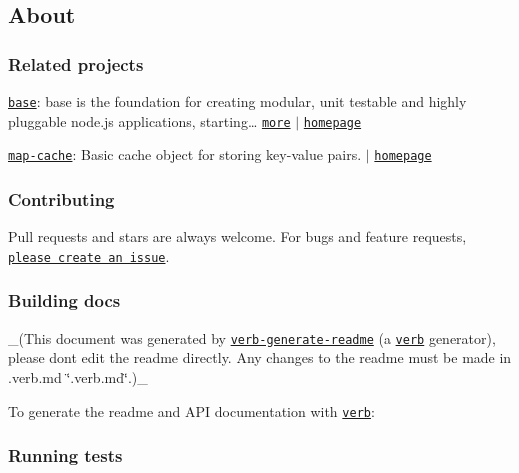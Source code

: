 \subsection*{About}

\subsubsection*{Related projects}


\begin{DoxyItemize}
\item \href{https://www.npmjs.com/package/base}{\tt base}\+: base is the foundation for creating modular, unit testable and highly pluggable node.\+js applications, starting… \href{https://github.com/node-base/base}{\tt more} $\vert$ \href{https://github.com/node-base/base}{\tt homepage}
\item \href{https://www.npmjs.com/package/map-cache}{\tt map-\/cache}\+: Basic cache object for storing key-\/value pairs. $\vert$ \href{https://github.com/jonschlinkert/map-cache}{\tt homepage}
\end{DoxyItemize}

\subsubsection*{Contributing}

Pull requests and stars are always welcome. For bugs and feature requests, \href{../../issues/new}{\tt please create an issue}.

\subsubsection*{Building docs}

\+\_\+(This document was generated by \href{https://github.com/verbose/verb-generate-readme}{\tt verb-\/generate-\/readme} (a \href{https://github.com/verbose/verb}{\tt verb} generator), please don\textquotesingle{}t edit the readme directly. Any changes to the readme must be made in .verb.\+md \char`\"{}.\+verb.\+md\char`\"{}.)\+\_\+

To generate the readme and A\+PI documentation with \href{https://github.com/verbose/verb}{\tt verb}\+:




\subsubsection*{Running tests}

